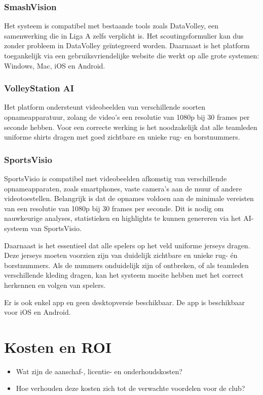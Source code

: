 \subsubsection{SmashVision}
Het systeem is compatibel met bestaande tools zoals DataVolley, een samenwerking die in Liga A zelfs verplicht is. Het scoutingsformulier kan dus zonder probleem in DataVolley geïntegreerd worden. Daarnaast is het platform toegankelijk via een gebruiksvriendelijke website die werkt op alle grote systemen: Windows, Mac, iOS en Android.
\subsubsection{VolleyStation AI}
Het platform ondersteunt videobeelden van verschillende soorten opnameapparatuur, zolang de video's een resolutie van 1080p bij 30 frames per seconde hebben. Voor een correcte werking is het noodzakelijk dat alle teamleden uniforme shirts dragen met goed zichtbare en unieke rug- en borstnummers.
\subsubsection{SportsVisio}
SportsVisio is compatibel met videobeelden afkomstig van verschillende opnameapparaten, zoals smartphones, vaste camera's aan de muur of andere videotoestellen. Belangrijk is dat de opnames voldoen aan de minimale vereisten van een resolutie van 1080p bij 30 frames per seconde. Dit is nodig om nauwkeurige analyses, statistieken en highlights te kunnen genereren via het AI-systeem van SportsVisio.

Daarnaast is het essentieel dat alle spelers op het veld uniforme jerseys dragen. Deze jerseys moeten voorzien zijn van duidelijk zichtbare en unieke rug- én borstnummers. Als de nummers onduidelijk zijn of ontbreken, of als teamleden verschillende kleding dragen, kan het systeem moeite hebben met het correct herkennen en volgen van spelers.

Er is ook enkel app en geen desktopversie beschikbaar. De app is beschikbaar voor iOS en Android.

\section{Kosten en ROI}
\begin{itemize}
  \item Wat zijn de aanschaf-, licentie- en onderhoudskosten?
  \item Hoe verhouden deze kosten zich tot de verwachte voordelen voor de club?
\end{itemize}

